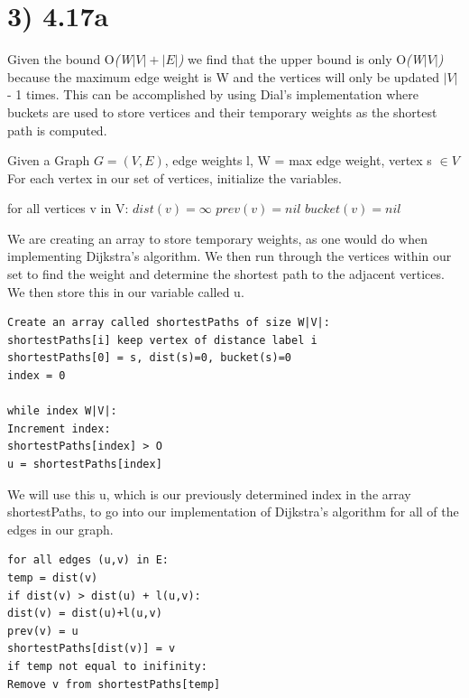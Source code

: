 \documentclass[a4paper]{article}
\begin{document}
\section*{3) 4.17a}
Given the bound O\textit{(W$\left|V\right| + \left|E\right|$)} we find that the upper bound is only O\textit{(W$\left|V\right|$)} because the maximum edge weight is W and the vertices will only be updated $\left|V\right|$ - 1 times. This can be accomplished by using Dial's implementation where buckets are used to store vertices and their temporary weights as the shortest path is computed.

Given a Graph $G=(V, E)$, edge weights l, W = max edge weight, vertex s $\in V$
For each vertex in our set of vertices, initialize the variables.

for all vertices v in V:
$dist(v) = \infty$
$prev(v) = nil$
$bucket(v) = nil$

We are creating an array to store temporary weights, as one would do when implementing Dijkstra's algorithm. We then run through the vertices within our set to find the weight and determine the shortest path to the adjacent vertices. We then store this in our variable called u.

\begin{verbatim}
Create an array called shortestPaths of size W|V|: 
shortestPaths[i] keep vertex of distance label i
shortestPaths[0] = s, dist(s)=0, bucket(s)=0
index = 0

while index W|V|:
Increment index:
shortestPaths[index] > O
u = shortestPaths[index]
\end{verbatim}

We will use this u, which is our previously determined index in the array shortestPaths, to go into our implementation of Dijkstra's algorithm for all of the edges in our graph.

\begin{verbatim}
for all edges (u,v) in E:
temp = dist(v)
if dist(v) > dist(u) + l(u,v):
dist(v) = dist(u)+l(u,v)
prev(v) = u
shortestPaths[dist(v)] = v
if temp not equal to inifinity:
Remove v from shortestPaths[temp]
\end{verbatim}
\end{document}

